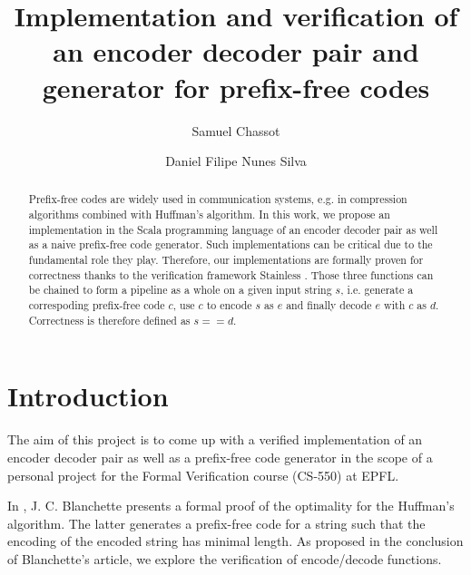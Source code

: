 \documentclass[a4paper,UKenglish,cleveref, autoref, thm-restate]{lipics-v2021}
\title{Implementation and verification of an encoder decoder pair and generator for prefix-free codes}
\author{Samuel Chassot}{EPFL}{samuel.chassot@epfl.ch}{}{}
\author{Daniel Filipe Nunes Silva}{EPFL}{daniel.nunessilva@epfl.ch}{}{}
\begin{document}
\maketitle

\begin{abstract}
    Prefix-free codes are widely used in communication systems, e.g. in compression algorithms combined with Huffman's algorithm. In this work, we propose an implementation in the Scala programming language of an encoder decoder pair as well as a naive prefix-free code generator. Such implementations can be critical due to the fundamental role they play. Therefore, our implementations are formally proven for correctness thanks to the verification framework Stainless \cite{stainless}. Those three functions can be chained to form a pipeline as a whole on a given input string $s$, i.e. generate a correspoding prefix-free code $c$, use $c$ to encode $s$ as $e$ and finally decode $e$ with $c$ as $d$. Correctness is therefore defined as $s == d$.
\end{abstract}

\lstset{language=scala}


\section{Introduction}
\label{sec:intro}

The aim of this project is to come up with a verified implementation of an encoder decoder pair as well as a prefix-free code generator in the scope of a personal project for the Formal Verification course (CS-550) at EPFL.

In \cite{blanchette}, J. C. Blanchette presents a formal proof of the optimality for the Huffman's algorithm. The latter generates a prefix-free code for a string such that the encoding of the encoded string has minimal length. As proposed in the conclusion of Blanchette's article, we explore the verification of encode/decode functions.
\end{document}
